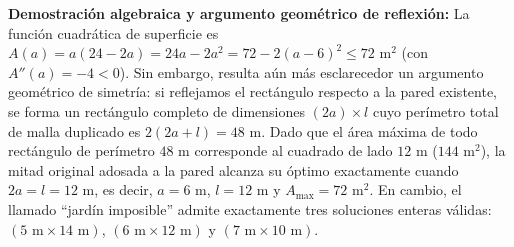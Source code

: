 \documentclass[spanish,letterpaper,oneside]{article}
\begin{document}
\textbf{Demostración algebraica y argumento geométrico de reflexión:} La función cuadrática de superficie es $A(a) = a(24 - 2a) = 24a - 2a^2 = 72 - 2(a - 6)^2 \le 72\text{ m}^2$ (con $A''(a)=-4<0$). Sin embargo, resulta aún más esclarecedor un argumento geométrico de simetría: si reflejamos el rectángulo respecto a la pared existente, se forma un rectángulo completo de dimensiones $(2a)\times l$ cuyo perímetro total de malla duplicado es $2(2a + l) = 48\text{ m}$. Dado que el área máxima de todo rectángulo de perímetro $48\text{ m}$ corresponde al cuadrado de lado $12\text{ m}$ ($144\text{ m}^2$), la mitad original adosada a la pared alcanza su óptimo exactamente cuando $2a = l = 12\text{ m}$, es decir, $a = 6\text{ m}$, $l = 12\text{ m}$ y $A_{\max} = 72\text{ m}^2$. En cambio, el llamado ``jardín imposible'' admite exactamente tres soluciones enteras válidas: $(5\text{ m}\times 14\text{ m})$, $(6\text{ m}\times 12\text{ m})$ y $(7\text{ m}\times 10\text{ m})$.
\end{document}
